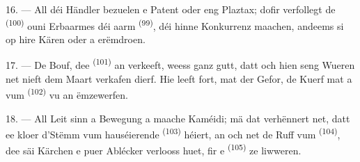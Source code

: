 16. --- All déi Händler bezuelen e Patent oder eng Plaztax; dofir verfollegt de
 \textsuperscript{(100)} ouni Erbaarmes déi aarm
 \textsuperscript{(99)}, déi hinne Konkurrenz maachen,
andeems si op hire Kären  oder
 a
 erëmdroen.

\VUsaut{4.0mm}
\VUsaut{3.0mm}

17. --- De Bouf, dee  \textsuperscript{(101)} an 
verkeeft, weess ganz gutt, datt och hien seng Wueren net nieft dem Maart verkafen
dierf. Hie leeft fort, mat der Gefor, de Kuerf mat  a
 vum  \textsuperscript{(102)} vu
 an  ëmzewerfen.

18. --- All Leit sinn a Bewegung a maache Kaméidi; mä dat verhënnert net, datt ee
kloer d'Stëmm vum hauséierende  \textsuperscript{(103)} héiert, an och
net de Ruff vum  \textsuperscript{(104)}, dee säi Kärchen e puer
Ablécker verlooss huet, fir e  \textsuperscript{(105)} ze
liwweren.

\VUsaut{6.0mm}
\VUfilet{22mm}
